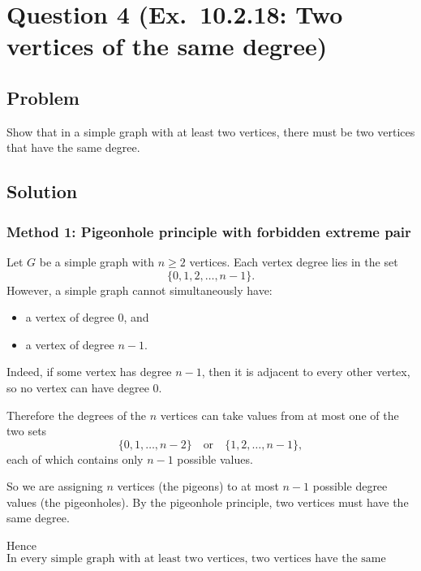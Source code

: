 \documentclass[12pt]{article}
\begin{document}
\newpage

\section{Question 4 (Ex.\ 10.2.18: Two vertices of the same degree)}

\subsection{Problem}
Show that in a simple graph with at least two vertices, there must be two vertices that have the same degree.

\subsection{Solution}

\subsubsection{Method 1: Pigeonhole principle with forbidden extreme pair}
Let \(G\) be a simple graph with \(n\ge 2\) vertices. Each vertex degree lies in the set
\[
\{0,1,2,\dots,n-1\}.
\]
However, a simple graph cannot simultaneously have:
\begin{itemize}[leftmargin=*]
  \item a vertex of degree \(0\), and
  \item a vertex of degree \(n-1\).
\end{itemize}
Indeed, if some vertex has degree \(n-1\), then it is adjacent to every other vertex, so no vertex can have degree \(0\).

Therefore the degrees of the \(n\) vertices can take values from at most one of the two sets
\[
\{0,1,\dots,n-2\}
\quad\text{or}\quad
\{1,2,\dots,n-1\},
\]
each of which contains only \(n-1\) possible values.

So we are assigning \(n\) vertices (the pigeons) to at most \(n-1\) possible degree values (the pigeonholes). By the pigeonhole principle, two vertices must have the same degree.

Hence
\[
\boxed{\text{In every simple graph with at least two vertices, two vertices have the same degree.}}
\]
\end{document}

